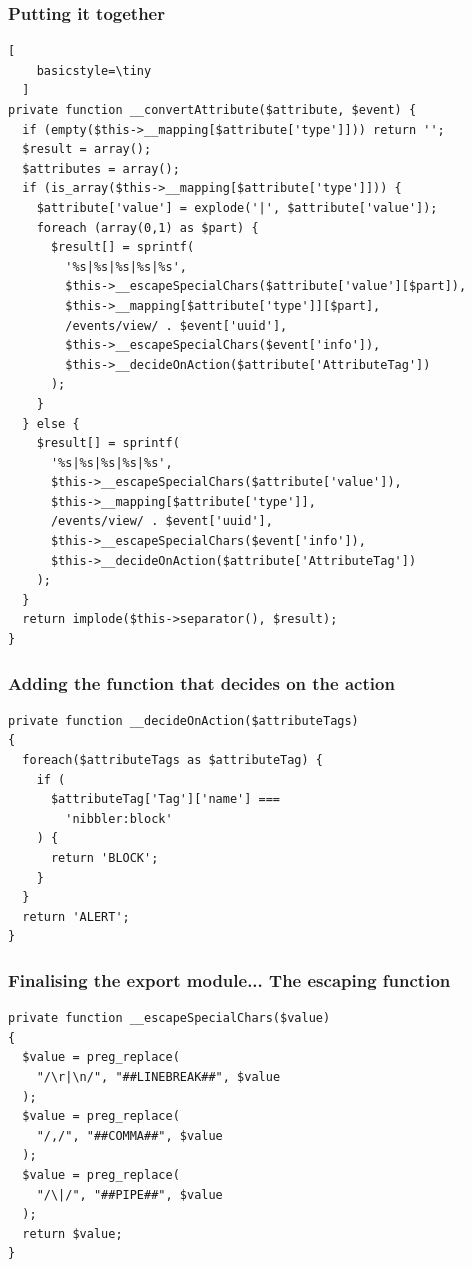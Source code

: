 \begin{frame}[fragile]
  \frametitle{Putting it together}
  \begin{lstlisting}[
    basicstyle=\tiny
  ]
private function __convertAttribute($attribute, $event) {
  if (empty($this->__mapping[$attribute['type']])) return '';
  $result = array();
  $attributes = array();
  if (is_array($this->__mapping[$attribute['type']])) {
    $attribute['value'] = explode('|', $attribute['value']);
    foreach (array(0,1) as $part) {
      $result[] = sprintf(
        '%s|%s|%s|%s|%s',
        $this->__escapeSpecialChars($attribute['value'][$part]),
        $this->__mapping[$attribute['type']][$part],
        /events/view/ . $event['uuid'],
        $this->__escapeSpecialChars($event['info']),
        $this->__decideOnAction($attribute['AttributeTag'])
      );
    }
  } else {
    $result[] = sprintf(
      '%s|%s|%s|%s|%s',
      $this->__escapeSpecialChars($attribute['value']),
      $this->__mapping[$attribute['type']],
      /events/view/ . $event['uuid'],
      $this->__escapeSpecialChars($event['info']),
      $this->__decideOnAction($attribute['AttributeTag'])
    );
  }
  return implode($this->separator(), $result);
}
  \end{lstlisting}
\end{frame}

\begin{frame}[fragile]
  \frametitle{Adding the function that decides on the action}
  \begin{lstlisting}
private function __decideOnAction($attributeTags)
{
  foreach($attributeTags as $attributeTag) {
    if (
      $attributeTag['Tag']['name'] ===
        'nibbler:block'
    ) {
      return 'BLOCK';
    }
  }
  return 'ALERT';
}
  \end{lstlisting}
\end{frame}

\begin{frame}[fragile]
  \frametitle{Finalising the export module... The escaping function}
  \begin{lstlisting}
private function __escapeSpecialChars($value)
{
  $value = preg_replace(
    "/\r|\n/", "##LINEBREAK##", $value
  );
  $value = preg_replace(
    "/,/", "##COMMA##", $value
  );
  $value = preg_replace(
    "/\|/", "##PIPE##", $value
  );
  return $value;
}
  \end{lstlisting}
\end{frame}

